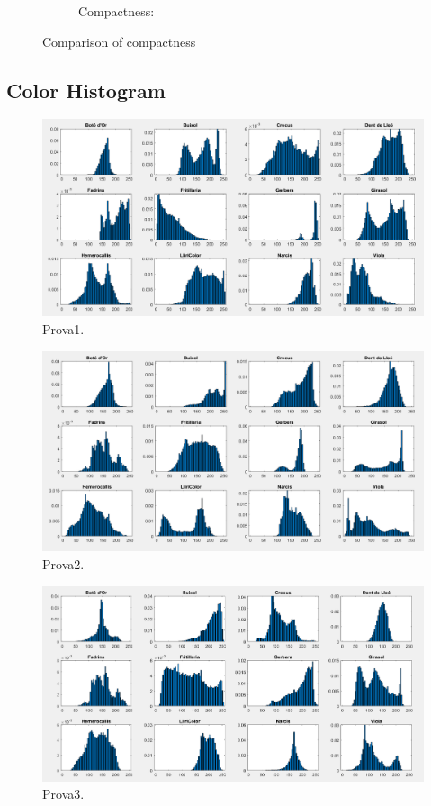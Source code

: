 \documentclass[11]{article}
\begin{document}
\begin{figure}[H]
\begin{subfigure}[t]{.49\linewidth}
    \caption{Compactness: \textbf{ }}
    \label{skez}
    \end{subfigure}
    \caption{Comparison of compactness}
\end{figure}


\subsection{Color Histogram}

\begin{figure}[H]
	\centering
	\includegraphics[scale=0.35]{images/colorHistogram1}
	\caption{Prova1.}
\end{figure}

\begin{figure}[H]
	\centering
	\includegraphics[scale=0.35]{images/colorHistogram2}
	\caption{Prova2.}
\end{figure}

\begin{figure}[H]
	\centering
	\includegraphics[scale=0.35]{images/colorHistogram3}
	\caption{Prova3.}
\end{figure}
\end{document}
